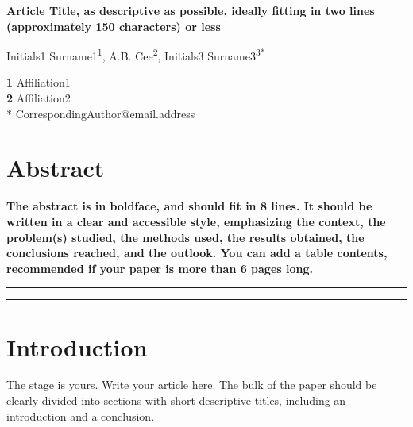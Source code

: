 \documentclass[submission]{SciPost}
\begin{document}
\begin{center}{\Large \textbf{
Article Title, as descriptive as possible, ideally fitting in two lines (approximately 150 characters) or less
}}\end{center}

\begin{center}
Initials1 Surname1\textsuperscript{1}, 
A.B. Cee\textsuperscript{2}, 
Initials3 Surname3\textsuperscript{3*}
\end{center}

\begin{center}
{\bf 1} Affiliation1
\\
{\bf 2} Affiliation2
\\
* CorrespondingAuthor@email.address
\bigskip
\end{center}

\linenumbers

\section*{Abstract}
{\bf 
The abstract is in boldface, and should fit in 8 lines.
It should be written in a clear and accessible style, emphasizing the context, the problem(s) studied, the methods used, the results obtained, the conclusions reached, and the outlook. You can add a table contents, recommended if your paper is more than 6 pages long. 
}


\vspace{10pt}
\noindent\rule{\textwidth}{1pt}
\tableofcontents\thispagestyle{fancy}
\noindent\rule{\textwidth}{1pt}
\vspace{10pt}


\section{Introduction}
\label{sec:intro}
The stage is yours. Write your article here.
The bulk of the paper should be clearly divided into sections with short descriptive titles, including an introduction and a conclusion.
\end{document}
